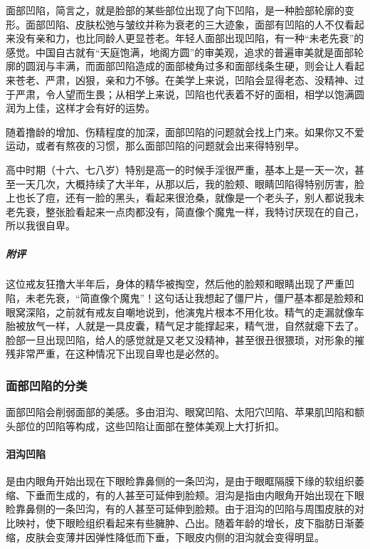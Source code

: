 面部凹陷，简言之，就是脸部的某些部位出现了向下凹陷，是一种脸部轮廓的变形。面部凹陷、皮肤松弛与皱纹并称为衰老的三大迹象，面部有凹陷的人不仅看起来没有亲和力，也比同龄人更显苍老。年轻人面部出现凹陷，有一种“未老先衰”的感觉。中国自古就有“天庭饱满，地阁方圆”的审美观，追求的普遍审美就是面部轮廓的圆润与丰满，而面部凹陷造成的面部棱角过多和面部线条生硬，则会让人看起来苍老、严肃，凶狠，亲和力不够。在美学上来说，凹陷会显得老态、没精神、过于严肃，令人望而生畏；从相学上来说，凹陷也代表着不好的面相，相学以饱满圆润为上佳，这样才会有好的运势。

随着撸龄的增加、伤精程度的加深，面部凹陷的问题就会找上门来。如果你又不爱运动，或者有熬夜的习惯，那么面部凹陷的问题就会出来得特别早。

\begin{case}[面部凹陷]
    高中时期（十六、七八岁）特别是高一的时候手淫很严重，基本上是一天一次，甚至一天几次，大概持续了大半年，从那以后，我的脸颊、眼睛凹陷得特别厉害，脸上也长了痘，还有一脸的黑头，看起来很沧桑，就像是一个老头子，别人都说我未老先衰，整张脸看起来一点肉都没有，简直像个魔鬼一样，我特讨厌现在的自己，所以我很自卑。
    \subparagraph{附评} 这位戒友狂撸大半年后，身体的精华被掏空，然后他的脸颊和眼睛出现了严重凹陷，未老先衰，“简直像个魔鬼”！这句话让我想起了僵尸片，僵尸基本都是脸颊和眼窝深陷，之前就有戒友自嘲地说到，他演鬼片根本不用化妆。精气的走漏就像车胎被放气一样，人就是一具皮囊，精气足才能撑起来，精气泄，自然就瘪下去了。脸部一旦出现凹陷，给人的感觉就是又老又没精神，甚至很丑很猥琐，对形象的摧残非常严重，在这种情况下出现自卑也是必然的。
\end{case}

\subsubsection{面部凹陷的分类}

面部凹陷会削弱面部的美感。多由泪沟、眼窝凹陷、太阳穴凹陷、苹果肌凹陷和额头部位的凹陷等构成，这些凹陷让面部在整体美观上大打折扣。

\paragraph{泪沟凹陷} 是由内眼角开始出现在下眼睑靠鼻侧的一条凹沟，是由于眼眶隔膜下缘的软组织萎缩、下垂而生成的，有的人甚至可延伸到脸颊。泪沟是指由内眼角开始出现在下眼睑靠鼻侧的一条凹沟，有的人甚至可延伸到脸颊。由于泪沟的凹陷与周围皮肤的对比映衬，使下眼睑组织看起来有些臃肿、凸出。随着年龄的增长，皮下脂肪日渐萎缩，皮肤会变薄并因弹性降低而下垂，下眼皮内侧的泪沟就会变得明显。

